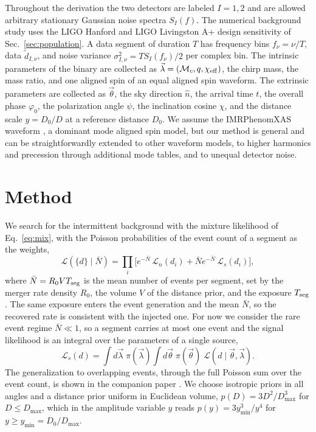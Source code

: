 \documentclass[aps,prd,twocolumn,superscriptaddress,nofootinbib]{revtex4-2}
\newcommand{\Mc}{\mathcal{M}_c}
\begin{document}
Throughout the derivation the two detectors are labeled $I = 1, 2$ and are allowed arbitrary stationary Gaussian noise spectra $S_I(f)$. The numerical background study uses the LIGO Hanford and LIGO Livingston A+ design sensitivity of Sec.~\ref{sec:population}. A data segment of duration $T$ has frequency bins $f_\nu = \nu / T$, data $\tilde d_{I,\nu}$, and noise variance $\sigma^2_{I,\nu} = T S_I(f_\nu) / 2$ per complex bin. The intrinsic parameters of the binary are collected as $\vec\lambda = (\Mc, q, \chi_{\rm eff})$, the chirp mass, the mass ratio, and one aligned spin of an equal aligned spin waveform. The extrinsic parameters are collected as $\vec\theta$, the sky direction $\hat n$, the arrival time $t$, the overall phase $\varphi_0$, the polarization angle $\psi$, the inclination cosine $\chi$, and the distance scale $y = D_0 / D$ at a reference distance $D_0$. We assume the IMRPhenomXAS waveform \cite{XAS}, a dominant mode aligned spin model, but our method is general and can be straightforwardly extended to other waveform models, to higher harmonics and precession through additional mode tables, and to unequal detector noise.

\section{Method}
\label{sec:method}

We search for the intermittent background with the mixture likelihood of Eq.~\eqref{eq:mix}, with the Poisson probabilities of the event count of a segment as the weights,
\begin{equation}
\mathcal{L}(\{d\} \mid \bar N) = \prod_i \Big[
e^{-\bar N}\, \mathcal{L}_n(d_i)
+ \bar N e^{-\bar N}\, \mathcal{L}_s(d_i) \Big],
\label{eq:mixture}
\end{equation}
where $\bar N = R_0 V T_{\rm seg}$ is the mean number of events per segment, set by the merger rate density $R_0$, the volume $V$ of the distance prior, and the exposure $T_{\rm seg}$. The same exposure enters the event generation and the mean $\bar N$, so the recovered rate is consistent with the injected one. For now we consider the rare event regime $\bar N \ll 1$, so a segment carries at most one event and the signal likelihood is an integral over the parameters of a single source,
\begin{equation}
\mathcal{L}_s(d) = \int d\vec\lambda\; \pi(\vec\lambda)
\int d\vec\theta\; \pi(\vec\theta)\;
\mathcal{L}(d \mid \vec\theta, \vec\lambda).
\label{eq:ls}
\end{equation}
The generalization to overlapping events, through the full Poisson sum over the event count, is shown in the companion paper \cite{companion}. We choose isotropic priors in all angles and a distance prior uniform in Euclidean volume, $p(D) = 3 D^2 / D_{\max}^3$ for $D \le D_{\max}$, which in the amplitude variable $y$ reads $p(y) = 3 y_{\min}^3 / y^4$ for $y \ge y_{\min} = D_0 / D_{\max}$.
\end{document}
